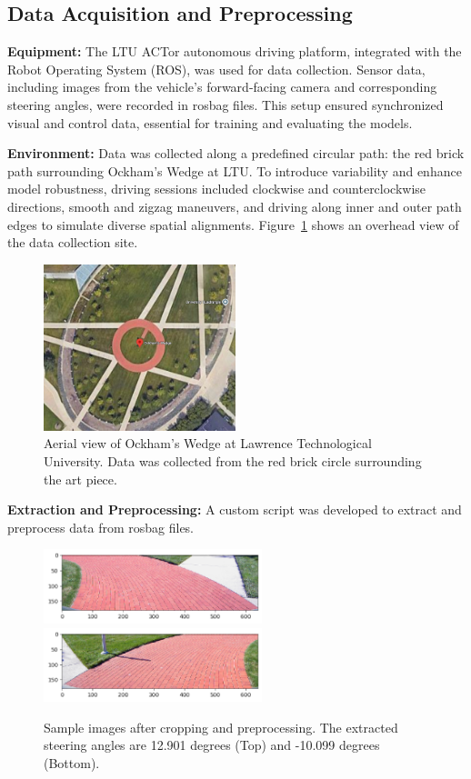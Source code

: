 \documentclass[conference]{IEEEtran}
\begin{document}
\subsection{Data Acquisition and Preprocessing}

\textbf{Equipment:} The LTU ACTor autonomous driving platform, integrated with the Robot Operating System (ROS), was used for data collection. Sensor data, including images from the vehicle's forward-facing camera and corresponding steering angles, were recorded in rosbag files. This setup ensured synchronized visual and control data, essential for training and evaluating the models.

\textbf{Environment:} Data was collected along a predefined circular path: the red brick path surrounding Ockham's Wedge at LTU. To introduce variability and enhance model robustness, driving sessions included clockwise and counterclockwise directions, smooth and zigzag maneuvers, and driving along inner and outer path edges to simulate diverse spatial alignments. Figure~\ref{fig:ockham} shows an overhead view of the data collection site.

\begin{figure}[ht]
    \centering
    \includegraphics[width=2.2in]{assets/circle-maps.png}
    \caption{ Aerial view of Ockham's Wedge at Lawrence Technological University. Data was collected from the red brick circle surrounding the art piece. }
    \label{fig:ockham}
\end{figure}

\textbf{Extraction and Preprocessing:} A custom script was developed to extract and preprocess data from rosbag files.

\begin{figure}[ht]
    \centering
    \includegraphics[width=2.5in]{assets/leftturn.png}
    \includegraphics[width=2.5in]{assets/rightturn.png}
    \caption{Sample images after cropping and preprocessing. The extracted steering angles are 12.901 degrees (Top) and -10.099 degrees (Bottom).}
    \label{fig:preprocessed_images}
\end{figure}
\end{document}

